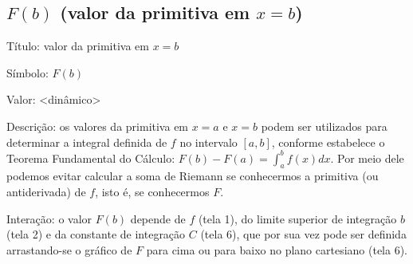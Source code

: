 \documentclass[a4paper,10pt]{scrartcl}
\begin{document}
  \subsection*{$F(b)$ (valor da primitiva em $x=b$)}
    \begin{compactdesc}
	\item{Título:} valor da primitiva em $x = b$
	\item{Símbolo:} $F(b)$
	\item{Valor:} <dinâmico>
	\item{Descrição:} os valores da primitiva em $x = a$ e $x = b$ podem ser utilizados para determinar a integral definida de $f$ no intervalo $[a,b]$, conforme estabelece o Teorema Fundamental do Cálculo: $F(b)-F(a) = \int_a^b f(x) dx$. Por meio dele podemos evitar calcular a soma de Riemann se conhecermos a primitiva (ou antiderivada) de $f$, isto é, se conhecermos $F$.
	\item{Interação:} o valor $F(b)$ depende de $f$ (tela 1), do limite superior de integração $b$ (tela 2) e da constante de integração $C$ (tela 6), que por sua vez pode ser definida arrastando-se o gráfico de $F$ para cima ou para baixo no plano cartesiano (tela 6).
    \end{compactdesc}
    
\end{document}
